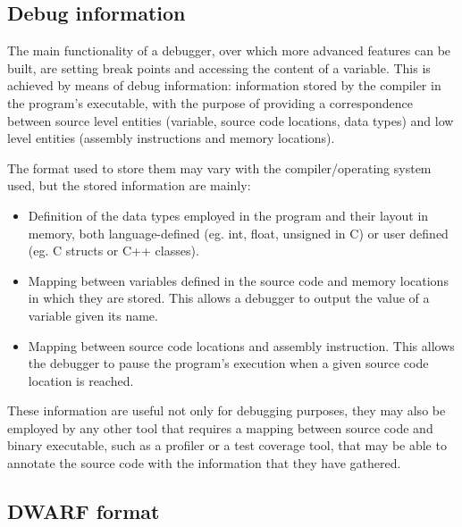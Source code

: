 \subsection{Debug information}
The main functionality of a debugger, over which more advanced features can be built, are setting break points and accessing the content of a variable. \newline 
This is achieved by means of debug information: information stored by the compiler in the program's executable, with the purpose of providing a correspondence between source level entities (variable, source code locations, data types) and low level entities (assembly instructions and memory locations). \par
The format used to store them may vary with the compiler/operating system used, but the stored information are mainly:
\begin{itemize}
\item Definition of the data types employed in the program and their layout in memory, both language-defined (eg. int, float, unsigned in C) or user defined (eg. C structs or C++ classes). 
\item Mapping between variables defined in the source code and memory locations in which they are stored. This allows a debugger to output the value of a variable given its name.
\item Mapping between source code locations and assembly instruction. This allows the debugger to pause the program's execution when a given source code location is reached.
\end{itemize}
These information are useful not only for debugging purposes, they may also be employed by any other tool that requires a mapping between source code and binary executable, such as a profiler or a test coverage tool, that may be able to annotate the source code with the information that they have gathered.

\subsection{DWARF format}

